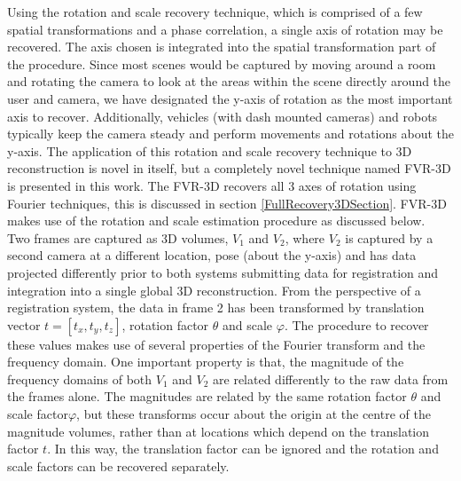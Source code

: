 Using the rotation and scale recovery technique, which is comprised of a few spatial transformations and a phase correlation, a single axis of rotation may be recovered. The axis chosen is integrated into the spatial transformation part of the procedure. Since most scenes would be captured by moving around a room and rotating the camera to look at the areas within the scene directly around the user and camera, we have designated the y-axis of rotation as the most important axis to recover. Additionally, vehicles (with dash mounted cameras) and robots typically keep the camera steady and perform movements and rotations about the y-axis. The application of this rotation and scale recovery technique to 3D reconstruction is novel in itself, but a completely novel technique named FVR-3D is presented in this work. The FVR-3D recovers all 3 axes of rotation using Fourier techniques, this is discussed in section \ref{FullRecovery3DSection}. FVR-3D makes use of the rotation and scale estimation procedure as discussed below.  \\


Two frames are captured as 3D volumes, $V_1$ and $V_2$, where $V_2$ is captured by a second camera at a different location, pose (about the y-axis) and has data projected differently prior to both systems submitting data for registration and integration into a single global 3D reconstruction. From the perspective of a registration system, the data in frame 2 has been transformed by translation vector $t = [t_x, t_y, t_z]$, rotation factor $\theta$ and scale $\varphi$. The procedure to recover these values makes use of several properties of the Fourier transform and the frequency domain. One important property is that, the magnitude of the frequency domains of both $V_1$ and $V_2$ are related differently to the raw data from the frames alone. The magnitudes are related by the same rotation factor $\theta$ and scale factor$\varphi$, but these transforms occur about the origin at the centre of the magnitude volumes, rather than at locations which depend on the translation factor $t$. In this way, the translation factor can be ignored and the rotation and scale factors can be recovered separately. \\

